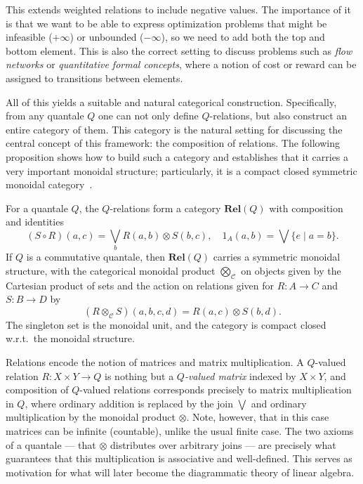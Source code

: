This extends weighted relations to include negative values. The importance of it is that we want
to be able to express optimization problems that might be infeasible
($+\infty$) or unbounded ($-\infty$), so we need to add both
the top and bottom element. This is also the correct setting to discuss problems such as \textit{flow networks} or \textit{quantitative formal concepts}, where a notion of cost or reward can be assigned to transitions between elements.

All of this yields a suitable and natural categorical construction.
Specifically, from any quantale $Q$ one can not only define $Q$-relations,
but also construct an entire category of them.
This category is the natural setting for discussing the
central concept of this framework: the composition of relations.
The following proposition shows how to build such a category and establishes
that it carries a very important monoidal structure;
particularly, it is a compact closed
symmetric monoidal category~\cite{maclane1998categories}.

\begin{proposition}\label{prop:relq}
	For a quantale $Q$, the $Q$-relations form a category $\mathbf{Rel}(Q)$ with composition and identities
	\[
		(S\circ R) (a,c) = \bigvee_b R(a,b) \otimes S(b,c), \quad 1_A(a,b) = \bigvee \{e \mid a=b\}.
	\]
	If $Q$ is a commutative quantale, then $\mathbf{Rel}(Q)$ carries a symmetric monoidal structure, with the categorical monoidal product $\bigotimes_{\mathcal{C}}$ on objects given by the Cartesian product of sets and the action on relations given for $R:A \to C$ and $S:B\to D$ by
	\[
		(R\otimes_{\mathcal{C}} S)(a,b,c,d) = R(a,c) \otimes S(b,d).
	\]
	The singleton set is the monoidal unit, and the category is compact closed w.r.t.\ the monoidal structure.
\end{proposition}

Relations encode the notion of matrices and matrix multiplication. A $Q$-valued relation $R : X \times Y \to Q$ is nothing but a \emph{$Q$-valued matrix} indexed by $X \times Y$, and composition of $Q$-valued relations corresponds precisely to matrix multiplication in $Q$, where ordinary addition is replaced by the join $\bigvee$ and ordinary multiplication by the monoidal product $\otimes$. Note, however, that in this case matrices can be infinite (countable), unlike the usual finite case.
The two axioms of a quantale --- that $\otimes$ distributes over arbitrary joins --- are precisely what guarantees that this multiplication is associative and well-defined. This serves as motivation for what will later become the diagrammatic theory of linear algebra.


